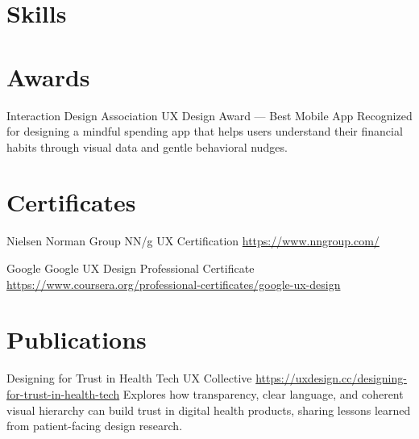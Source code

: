 \documentclass[a4paper, serif, 10pt]{moderncv}
\begin{document}
\section{Skills}

\section{Awards}

        {Interaction Design Association}
        {UX Design Award — Best Mobile App}
        {}
        {}
        {Recognized for designing a mindful spending app that helps users understand their financial habits through visual data and gentle behavioral nudges.}
\section{Certificates}

        {Nielsen Norman Group}
        {NN/g UX Certification}
        {\url{https://www.nngroup.com/}}
        {}
        {}

        {Google}
        {Google UX Design Professional Certificate}
        {\url{https://www.coursera.org/professional-certificates/google-ux-design}}
        {}
        {}
\section{Publications}

        {Designing for Trust in Health Tech}
        {UX Collective}
        {\url{https://uxdesign.cc/designing-for-trust-in-health-tech}}
        {}
        {Explores how transparency, clear language, and coherent visual hierarchy can build trust in digital health products, sharing lessons learned from patient-facing design research.}
\end{document}
